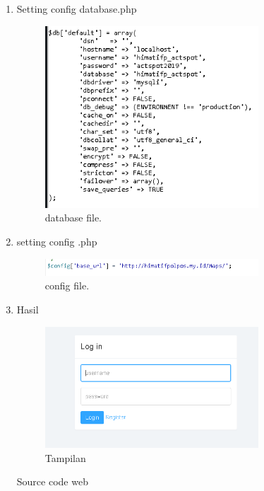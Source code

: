 \begin{itemize}
\begin{enumerate}
	\item Setting config database.php
\begin{figure}[H]
	\includegraphics[width=8cm]{figures/web/4_databasesetting.PNG}
	\centering
	\caption{database file.}
\end{figure}	
	\item setting config .php
\begin{figure}[H]
	\includegraphics[width=8cm]{figures/web/5_config.PNG}
	\centering
	\caption{config file.}
\end{figure}	

	\item Hasil
\begin{figure}[H]
	\includegraphics[width=8cm]{figures/web/6_tampilan.PNG}
	\centering
	\caption{Tampilan}
\end{figure}	

Source code web




















	\end{enumerate}
\end{itemize}




